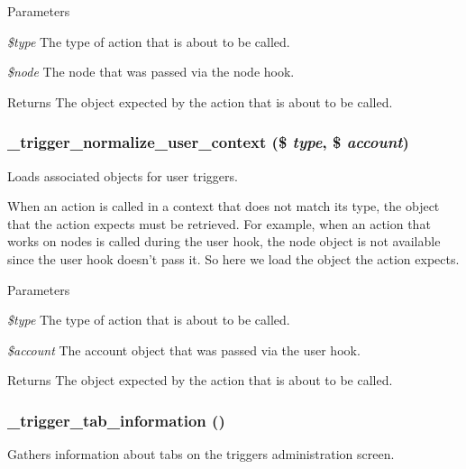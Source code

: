 \begin{DoxyParams}{Parameters}
\item[{\em \$type}]The type of action that is about to be called. \item[{\em \$node}]The node that was passed via the node hook.\end{DoxyParams}
\begin{DoxyReturn}{Returns}
The object expected by the action that is about to be called. 
\end{DoxyReturn}
\hypertarget{trigger_8module_af7fb52a5819839211a9a8544d71aada9}{
\subsubsection[{\_\-trigger\_\-normalize\_\-user\_\-context}]{\setlength{\rightskip}{0pt plus 5cm}\_\-trigger\_\-normalize\_\-user\_\-context (\$ {\em type}, \/  \$ {\em account})}}
\label{trigger_8module_af7fb52a5819839211a9a8544d71aada9}
Loads associated objects for user triggers.

When an action is called in a context that does not match its type, the object that the action expects must be retrieved. For example, when an action that works on nodes is called during the user hook, the node object is not available since the user hook doesn't pass it. So here we load the object the action expects.


\begin{DoxyParams}{Parameters}
\item[{\em \$type}]The type of action that is about to be called. \item[{\em \$account}]The account object that was passed via the user hook.\end{DoxyParams}
\begin{DoxyReturn}{Returns}
The object expected by the action that is about to be called. 
\end{DoxyReturn}
\hypertarget{trigger_8module_ad4f48e6fb2a3a4bb7267edfe8b4dbf83}{
\subsubsection[{\_\-trigger\_\-tab\_\-information}]{\setlength{\rightskip}{0pt plus 5cm}\_\-trigger\_\-tab\_\-information ()}}
\label{trigger_8module_ad4f48e6fb2a3a4bb7267edfe8b4dbf83}
Gathers information about tabs on the triggers administration screen.

